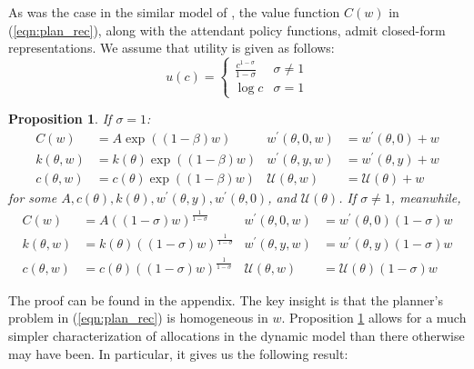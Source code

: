 \documentclass[11pt]{article}
\newtheorem{proposition}{Proposition}
\begin{document}
As was the case in the similar model of \cite{shourideh2014optimal}, the value function \( C(w) \) in (\ref{eqn:plan_rec}), along with the attendant policy functions, admit closed-form representations. We assume that utility is given as follows:
\begin{equation}
    u\left(c\right)=\begin{cases}
        \frac{c^{1-\sigma}}{1-\sigma} & \sigma\ne1\\
        \log c & \sigma=1
        \end{cases}
\end{equation}

\begin{proposition} \label{prop:closed_form}
    If \( \sigma = 1 \):
    \begin{align*}
        C(w) &= A\exp\left( \left(1-\beta\right)w \right) &
        w^{\prime}\left(\theta,0,w\right)&=w^{\prime}\left(\theta,0\right)+w \\
        k\left(\theta,w\right)&=k\left(\theta\right)\exp\left(\left(1-\beta\right)w\right) & 
        w^{\prime}\left(\theta,y,w\right)&=w^{\prime}\left(\theta,y\right)+w \\
        c\left(\theta,w\right)&=c\left(\theta\right)\exp\left(\left(1-\beta\right)w\right) &
        \mathcal{U}\left(\theta,w\right)&=\mathcal{U}\left(\theta\right)+w
    \end{align*}
    for some \( A,c\left(\theta\right),k\left(\theta\right),w^{\prime}\left(\theta,y\right),w^{\prime}\left(\theta,0\right) \), and \( \mathcal{U}\left( \theta \right) \). If \( \sigma\ne 1 \), meanwhile, 
    \begin{align*}
        C(w) &= A\left(\left(1-\sigma\right)w\right)^{\frac{1}{1-\sigma}} &
        w^{\prime}\left(\theta,0,w\right)&=w^{\prime}\left(\theta,0\right)\left( 1-\sigma \right)w \\
        k\left(\theta,w\right)&=k\left(\theta\right)\left(\left(1-\sigma\right)w\right)^{\frac{1}{1-\sigma}} & 
        w^{\prime}\left(\theta,y,w\right)&=w^{\prime}\left(\theta,y\right)\left( 1-\sigma \right)w \\
        c\left(\theta,w\right)&=c\left(\theta\right)\left(\left(1-\sigma\right)w\right)^{\frac{1}{1-\sigma}} &
        \mathcal{U}\left(\theta,w\right)&=\mathcal{U}\left(\theta\right)\left( 1-\sigma \right)w
    \end{align*}
\end{proposition}
The proof can be found in the appendix. The key insight is that the planner's problem in (\ref{eqn:plan_rec}) is homogeneous in \( w \). Proposition \ref{prop:closed_form} allows for a much simpler characterization of allocations in the dynamic model than there otherwise may have been. In particular, it gives us the following result:
\end{document}
